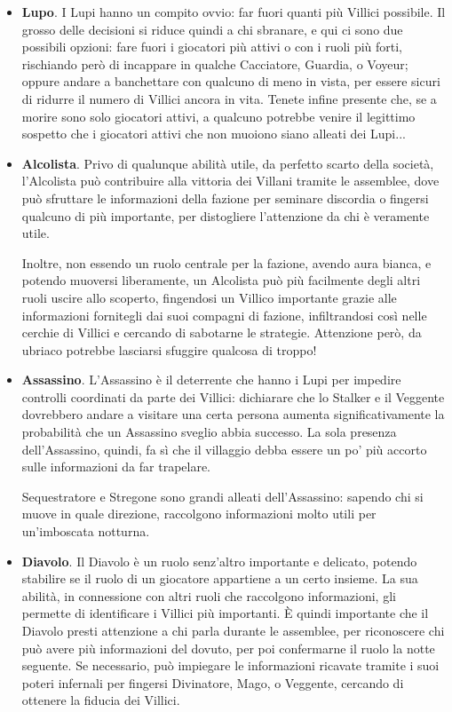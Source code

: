 \documentclass[a4paper,10pt]{article}
\begin{document}
\begin{itemize}

    \item {\bf Lupo}. I Lupi hanno un compito ovvio: far fuori quanti più Villici possibile. Il grosso delle decisioni si riduce quindi a chi sbranare, e qui ci sono due possibili opzioni: fare fuori i giocatori più attivi o con i ruoli più forti, rischiando però di incappare in qualche Cacciatore, Guardia, o Voyeur; oppure andare a banchettare con qualcuno di meno in vista, per essere sicuri di ridurre il numero di Villici ancora in vita. Tenete infine presente che, se a morire sono solo giocatori attivi, a qualcuno potrebbe venire il legittimo sospetto che i giocatori attivi che non muoiono siano alleati dei Lupi...

	\item {\bf Alcolista}. Privo di qualunque abilità utile, da perfetto scarto della società, l'Alcolista può contribuire alla vittoria dei Villani tramite le assemblee, dove può sfruttare le informazioni della fazione per seminare discordia o fingersi qualcuno di più importante, per distogliere l'attenzione da chi è veramente utile.
	
	Inoltre, non essendo un ruolo centrale per la fazione, avendo aura bianca, e potendo muoversi liberamente, un Alcolista può più facilmente degli altri ruoli uscire allo scoperto, fingendosi un Villico importante grazie alle informazioni fornitegli dai suoi compagni di fazione, infiltrandosi così nelle cerchie di Villici e cercando di sabotarne le strategie. Attenzione però, da ubriaco potrebbe lasciarsi sfuggire qualcosa di troppo!
	
	\item {\bf Assassino}. L'Assassino è il deterrente che hanno i Lupi per impedire controlli coordinati da parte dei Villici: dichiarare che lo Stalker e il Veggente dovrebbero andare a visitare una certa persona aumenta significativamente la probabilità che un Assassino sveglio abbia successo. La sola presenza dell'Assassino, quindi, fa sì che il villaggio debba essere un po' più accorto sulle informazioni da far trapelare.
	
	Sequestratore e Stregone sono grandi alleati dell'Assassino: sapendo chi si muove in quale direzione, raccolgono informazioni molto utili per un'imboscata notturna. 
	
	\item {\bf Diavolo}. Il Diavolo è un ruolo senz'altro importante e delicato, potendo stabilire se il ruolo di un giocatore appartiene a un certo insieme. La sua abilità, in connessione con altri ruoli che raccolgono informazioni, gli permette di identificare i Villici più importanti. È quindi importante che il Diavolo presti attenzione a chi parla durante le assemblee, per riconoscere chi può avere più informazioni del dovuto, per poi confermarne il ruolo la notte seguente. Se necessario, può impiegare le informazioni ricavate tramite i suoi poteri infernali per fingersi Divinatore, Mago, o Veggente, cercando di ottenere la fiducia dei Villici.
	

\end{itemize}
\end{document}
